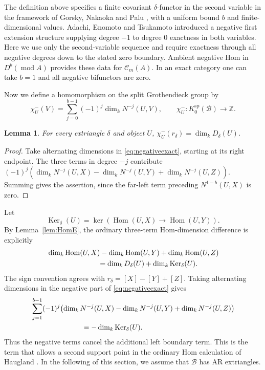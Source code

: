 \documentclass[pdflatex,sn-mathphys-num]{sn-jnl}
\numberwithin{equation}{section}
\newtheorem{lemma}[theorem]{Lemma}
\theoremstyle{definition}
\theoremstyle{remark}\newtheorem{remark}[theorem]{Remark}
\newcommand{\C}{\mathcal C}
\newcommand{\Hom}{\operatorname{Hom}}
\newcommand{\modu}{\operatorname{mod}}
\newcommand{\ksp}{K_0^{\mathrm{sp}}}
\newcommand{\dimk}{\dim_k}
\begin{document}
The definition above specifies a finite covariant $\delta$-functor
in the second variable in the framework of Gorsky, Nakaoka and Palu
\cite[Section 4]{GNP}, with a uniform bound $b$ and finite-dimensional
values. Adachi, Enomoto and Tsukamoto \cite[Definition 2.3]{AET} introduced a negative first extension
structure supplying degree $-1$ to degree $0$ exactness in both
variables. Here we use only the second-variable sequence and require
exactness through all negative degrees down to the stated zero
boundary. Ambient negative Hom in $D^b(\modu A)$ provides these data
for $\C_m(A)$. In an exact category one can take $b=1$ and all
negative bifunctors are zero.

Now we define a homomorphism on the split Grothendieck group by
\begin{equation}\label{eq:chi}
 \chi^-_U(V)=\sum_{j=0}^{b-1}(-1)^j\dimk N^{-j}(U,V),\qquad
 \chi^-_U:\ksp(\mathcal B)\longrightarrow\mathbb Z.
\end{equation}

\begin{lemma}\label{lem:defect}
For every extriangle $\delta$ and object $U$,
$\chi^-_U(r_\delta)=\dimk D_\delta(U)$.
\end{lemma}
\begin{proof}
Take alternating dimensions in \eqref{eq:negativeexact}, starting at
its right endpoint. The three terms in degree $-j$ contribute
$(-1)^j(\dimk N^{-j}(U,X)-\dimk N^{-j}(U,Y)+\dimk N^{-j}(U,Z))$.
Summing gives the assertion, since the far-left term preceding
$N^{1-b}(U,X)$ is zero.
\end{proof}

Let
\[
 \operatorname{Ker}_\delta(U)=\ker(\Hom(U,X)\to\Hom(U,Y)).
\]
By Lemma~\ref{lem:HomE}, the ordinary three-term Hom-dimension
difference is explicitly
\[
\begin{aligned}
 &\dimk\Hom(U,X)-\dimk\Hom(U,Y)+\dimk\Hom(U,Z)\\
 &\hspace{25mm}=\dimk D_\delta(U)+\dimk\operatorname{Ker}_\delta(U).
\end{aligned}
\]
The sign convention agrees with $r_\delta=[X]-[Y]+[Z]$.
Taking alternating dimensions in the negative part of
\eqref{eq:negativeexact} gives
\[
\begin{aligned}
 &\sum_{j=1}^{b-1}(-1)^j\bigl(\dimk N^{-j}(U,X)
       -\dimk N^{-j}(U,Y)+\dimk N^{-j}(U,Z)\bigr)\\
 &\hspace{25mm}=-\dimk\operatorname{Ker}_\delta(U).
\end{aligned}
\]
Thus the negative terms cancel the additional left boundary term.
This is the term that allows a second support point in the ordinary
Hom calculation of Haugland \cite[Lemma 2.3]{Haugland}. In the following of this section, we assume that $\mathcal B$ has AR extriangles.
\end{document}
